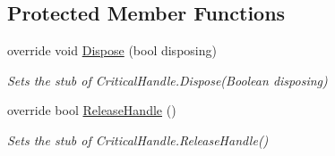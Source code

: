 \subsection*{Protected Member Functions}
\begin{DoxyCompactItemize}
\item 
override void \hyperlink{class_microsoft_1_1_win32_1_1_safe_handles_1_1_fakes_1_1_stub_critical_handle_zero_or_minus_one_is_invalid_aebff793c1924915ba5634f64aaa948a6}{Dispose} (bool disposing)
\begin{DoxyCompactList}\small\item\em Sets the stub of Critical\-Handle.\-Dispose(\-Boolean disposing)\end{DoxyCompactList}\item 
override bool \hyperlink{class_microsoft_1_1_win32_1_1_safe_handles_1_1_fakes_1_1_stub_critical_handle_zero_or_minus_one_is_invalid_a9461bf4692977cff2058fa372192099d}{Release\-Handle} ()
\begin{DoxyCompactList}\small\item\em Sets the stub of Critical\-Handle.\-Release\-Handle()\end{DoxyCompactList}\end{DoxyCompactItemize}
